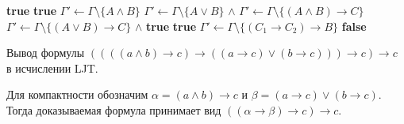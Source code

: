 \documentclass[14pt, russian]{scrartcl}
\begin{document}
\begin{listing}[!htb]
\caption{Обратный поиск вывода в LJT}
\label{alg:ljt-prove}
\begin{algorithmic}[1]
    \Return \textbf{true}
  \EndIf
  \If{$\bot \in \Gamma$}
    \Return \textbf{true}
  \EndIf
    \State $\Gamma' \gets \Gamma \setminus \{A \land B\}$
    \Return {}
  \EndIf
    \State $\Gamma' \gets \Gamma \setminus \{A \lor B\}$
    \Return {}
      $\land$ 
  \EndIf
    \Return {}
  \EndIf
    \State $\Gamma' \gets \Gamma \setminus \{(A \land B) \to C\}$
    \Return {}
  \EndIf
    \State $\Gamma' \gets \Gamma \setminus \{(A \lor B) \to C\}$
    \Return {}
  \EndIf
    \Return {}
  \EndIf
    \Return {}
      $\land$ 
  \EndIf
      \Return \textbf{true}
    \EndIf
      \Return \textbf{true}
    \EndIf
  \EndIf
    \State $\Gamma' \gets \Gamma \setminus \{(C_1 \to C_2) \to B\}$
      \Return {}
    \EndIf
  \EndFor
  \State \Return \textbf{false}
\EndFunction
\end{algorithmic}
\end{listing}

\anonappendix
\label{app:ljt-example}

Вывод формулы
$((((a \land b) \rightarrow c) \rightarrow ((a \rightarrow c) \lor (b \rightarrow c)))
\rightarrow c) \rightarrow c$
в исчислении LJT.

Для компактности обозначим
$\alpha = (a \land b) \rightarrow c$ и
$\beta = (a \rightarrow c) \lor (b \rightarrow c)$.
Тогда доказываемая формула принимает вид
$((\alpha \rightarrow \beta) \rightarrow c) \rightarrow c$.
\end{document}
